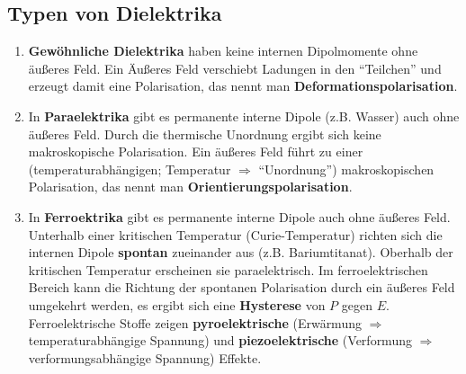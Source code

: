   \subsection{Typen von Dielektrika}
	  \begin{enumerate}
		  \item \textbf{Gewöhnliche Dielektrika} haben keine internen Dipolmomente ohne äußeres Feld. Ein Äußeres Feld verschiebt Ladungen in den \enquote{Teilchen} und erzeugt damit eine Polarisation, das nennt man \textbf{Deformationspolarisation}.
		  \item In \textbf{Paraelektrika} gibt es permanente interne Dipole (z.B. Wasser) auch ohne äußeres Feld. Durch die thermische Unordnung ergibt sich keine makroskopische Polarisation. Ein äußeres Feld führt zu einer (temperaturabhängigen; Temperatur $\Rightarrow$ \enquote{Unordnung}) makroskopischen Polarisation, das nennt man \textbf{Orientierungspolarisation}.
		  \item In \textbf{Ferroektrika} gibt es permanente interne Dipole auch ohne äußeres Feld. Unterhalb einer kritischen Temperatur (Curie-Temperatur) richten sich die internen Dipole \textbf{spontan} zueinander aus (z.B. Bariumtitanat).         Oberhalb der kritischen Temperatur erscheinen sie paraelektrisch. Im ferroelektrischen Bereich kann die Richtung der spontanen Polarisation durch ein äußeres Feld umgekehrt werden, es ergibt sich eine \textbf{Hysterese} von $P$ gegen $E$. Ferroelektrische Stoffe zeigen \textbf{pyroelektrische} (Erwärmung $\Rightarrow$ temperaturabhängige Spannung) und \textbf{piezoelektrische} (Verformung $\Rightarrow$ verformungsabhängige Spannung) Effekte.
	  \end{enumerate}
